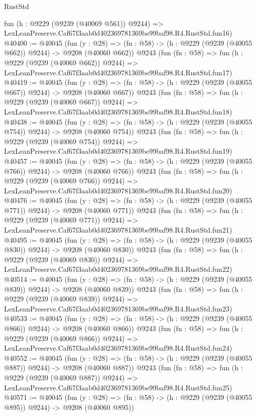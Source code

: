 \begin{lexlean}{RustStd}
\begin{coremodule}
    fun (h : @9229 (@9239 (@40069 @561)) @9244) =>
    LexLeanPreserve.Caf67f3aab0d402369781369be99baf98.R4.RustStd.fun16)
@40400 := @40045
    (fun (y : @28) => (fn : @58) -> (h : @9229 (@9239 (@40055 @662)) @9244) -> @9208 (@40060 @662))
    @9243
    (fun (fn : @58) =>
    fun (h : @9229 (@9239 (@40069 @662)) @9244) =>
    LexLeanPreserve.Caf67f3aab0d402369781369be99baf98.R4.RustStd.fun17)
@40419 := @40045
    (fun (y : @28) => (fn : @58) -> (h : @9229 (@9239 (@40055 @667)) @9244) -> @9208 (@40060 @667))
    @9243
    (fun (fn : @58) =>
    fun (h : @9229 (@9239 (@40069 @667)) @9244) =>
    LexLeanPreserve.Caf67f3aab0d402369781369be99baf98.R4.RustStd.fun18)
@40438 := @40045
    (fun (y : @28) => (fn : @58) -> (h : @9229 (@9239 (@40055 @754)) @9244) -> @9208 (@40060 @754))
    @9243
    (fun (fn : @58) =>
    fun (h : @9229 (@9239 (@40069 @754)) @9244) =>
    LexLeanPreserve.Caf67f3aab0d402369781369be99baf98.R4.RustStd.fun19)
@40457 := @40045
    (fun (y : @28) => (fn : @58) -> (h : @9229 (@9239 (@40055 @766)) @9244) -> @9208 (@40060 @766))
    @9243
    (fun (fn : @58) =>
    fun (h : @9229 (@9239 (@40069 @766)) @9244) =>
    LexLeanPreserve.Caf67f3aab0d402369781369be99baf98.R4.RustStd.fun20)
@40476 := @40045
    (fun (y : @28) => (fn : @58) -> (h : @9229 (@9239 (@40055 @771)) @9244) -> @9208 (@40060 @771))
    @9243
    (fun (fn : @58) =>
    fun (h : @9229 (@9239 (@40069 @771)) @9244) =>
    LexLeanPreserve.Caf67f3aab0d402369781369be99baf98.R4.RustStd.fun21)
@40495 := @40045
    (fun (y : @28) => (fn : @58) -> (h : @9229 (@9239 (@40055 @830)) @9244) -> @9208 (@40060 @830))
    @9243
    (fun (fn : @58) =>
    fun (h : @9229 (@9239 (@40069 @830)) @9244) =>
    LexLeanPreserve.Caf67f3aab0d402369781369be99baf98.R4.RustStd.fun22)
@40514 := @40045
    (fun (y : @28) => (fn : @58) -> (h : @9229 (@9239 (@40055 @839)) @9244) -> @9208 (@40060 @839))
    @9243
    (fun (fn : @58) =>
    fun (h : @9229 (@9239 (@40069 @839)) @9244) =>
    LexLeanPreserve.Caf67f3aab0d402369781369be99baf98.R4.RustStd.fun23)
@40533 := @40045
    (fun (y : @28) => (fn : @58) -> (h : @9229 (@9239 (@40055 @866)) @9244) -> @9208 (@40060 @866))
    @9243
    (fun (fn : @58) =>
    fun (h : @9229 (@9239 (@40069 @866)) @9244) =>
    LexLeanPreserve.Caf67f3aab0d402369781369be99baf98.R4.RustStd.fun24)
@40552 := @40045
    (fun (y : @28) => (fn : @58) -> (h : @9229 (@9239 (@40055 @887)) @9244) -> @9208 (@40060 @887))
    @9243
    (fun (fn : @58) =>
    fun (h : @9229 (@9239 (@40069 @887)) @9244) =>
    LexLeanPreserve.Caf67f3aab0d402369781369be99baf98.R4.RustStd.fun25)
@40571 := @40045
    (fun (y : @28) => (fn : @58) -> (h : @9229 (@9239 (@40055 @895)) @9244) -> @9208 (@40060 @895))

\end{coremodule}
\end{lexlean}
